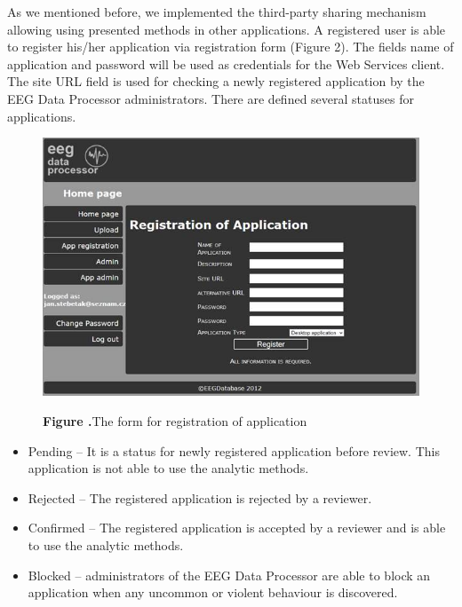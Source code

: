 \documentclass{frontiersSCNS} %
\begin{document}
As we mentioned before, we implemented the third-party sharing mechanism allowing using presented methods in other applications. A registered user is able to register his/her application via registration form (Figure 2). The fields name of application and password will be used as credentials for the Web Services client. The site URL field is used for checking a newly registered application by the EEG Data Processor administrators. There are defined several statuses for applications.

\begin{figure}
\begin{center}
\includegraphics[width=16cm]{edp01}%
\end{center}
\textbf{\label{fig:02} Figure .}{The form for registration of application }
\end{figure}

\begin{itemize}
\item Pending – It is a status for newly registered application before review. This application is not able to use the analytic methods.
\item Rejected – The registered application is rejected by a reviewer.
\item Confirmed – The registered application is accepted by a reviewer and is able to use the analytic methods.
\item Blocked – administrators of the EEG Data Processor are able to block an application when any uncommon or violent behaviour is discovered.

\end{itemize}
\end{document}
